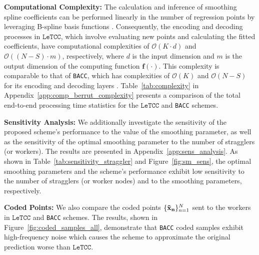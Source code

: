 \documentclass{article}
\def\nprcc{\texttt{LeTCC}}
\def\func{\mathbf{f}}
\begin{document}
{\bf Computational Complexity:} The calculation and inference of smoothing spline coefficients can be performed linearly in the number of regression points by leveraging B-spline basis functions \citep{eilers1996flexible,de2001calculation,hu1986complete}. Consequently, the encoding and decoding processes in $\nprcc$, which involve evaluating new points and calculating the fitted coefficients, have computational complexities of $\mathcal{O}(K \cdot d)$ and $\mathcal{O}((N - S) \cdot m)$, respectively, where $d$ is the input dimension and $m$ is the output dimension of the computing function $\func(\cdot)$. This complexity is comparable to that of \texttt{BACC}, which has complexities of $\mathcal{O}(K)$ and $\mathcal{O}(N - S)$ for its encoding and decoding layers \citep{jahani2022berrut}. Table~\ref{tab:complexity} in Appendix~\ref{app:comp_berrut_complexity} presents a comparison of the total end-to-end processing time statistics for the $\nprcc$ and \texttt{BACC} schemes.


{\bf Sensitivity Analysis:} We additionally investigate the sensitivity of the proposed scheme’s performance to the value of the smoothing parameter, as well as the sensitivity of the optimal smoothing parameter to the number of stragglers (or workers). The results are presented in Appendix~\ref{app:sens_analysis}. As shown in Table~\ref{tab:sensitivity_straggler} and Figure~\ref{fig:sm_sens}, the optimal smoothing parameters and the scheme's performance exhibit low sensitivity to the number of stragglers (or worker nodes) and to the smoothing parameters, respectively.



{\bf Coded Points:}
We also compare the coded points $\{\mathbf{\Tilde{x}_n}\}_{n=1}^N$ sent to the workers in $\nprcc$ and \texttt{BACC} schemes. The results, shown in Figure~\ref{fig:coded_samples_all}, demonstrate that \texttt{BACC} coded samples exhibit high-frequency noise which causes the scheme to approximate the original prediction worse than $\nprcc$.
\end{document}
